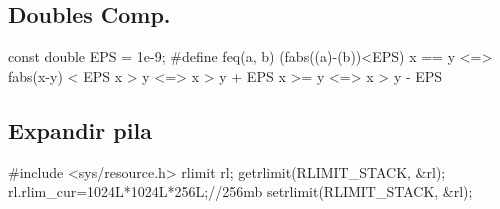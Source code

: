 \subsection*{Doubles Comp.}
\begin{code}
const double EPS = 1e-9;
#define feq(a, b) (fabs((a)-(b))<EPS)
x == y	<=> fabs(x-y) < EPS
x >  y	<=> x > y + EPS
x >= y	<=> x > y - EPS
\end{code}
\subsection*{Expandir pila}
\begin{code}
#include <sys/resource.h>
rlimit rl;
getrlimit(RLIMIT_STACK, &rl);
rl.rlim_cur=1024L*1024L*256L;//256mb
setrlimit(RLIMIT_STACK, &rl);
\end{code}
